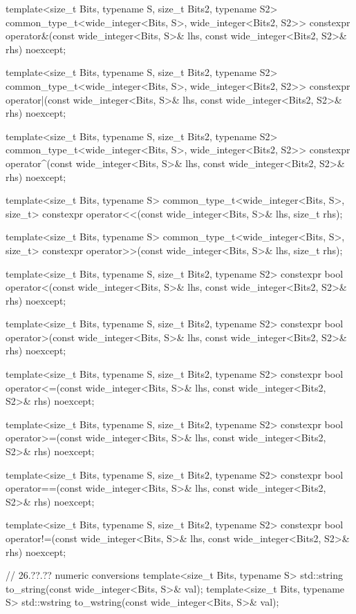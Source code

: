 \begin{codeblock}
{  template<size_t Bits, typename S, size_t Bits2, typename S2>
  common_type_t<wide_integer<Bits, S>, wide_integer<Bits2, S2>>
    constexpr operator&(const wide_integer<Bits, S>& lhs, const wide_integer<Bits2, S2>& rhs) noexcept;
  
  template<size_t Bits, typename S, size_t Bits2, typename S2>
  common_type_t<wide_integer<Bits, S>, wide_integer<Bits2, S2>>
    constexpr operator|(const wide_integer<Bits, S>& lhs, const wide_integer<Bits2, S2>& rhs) noexcept;
  
  template<size_t Bits, typename S, size_t Bits2, typename S2>
  common_type_t<wide_integer<Bits, S>, wide_integer<Bits2, S2>>
    constexpr  operator^(const wide_integer<Bits, S>& lhs, const wide_integer<Bits2, S2>& rhs) noexcept;
  
  template<size_t Bits, typename S>
  common_type_t<wide_integer<Bits, S>, size_t>
    constexpr  operator<<(const wide_integer<Bits, S>& lhs, size_t rhs);
  
  template<size_t Bits, typename S>
  common_type_t<wide_integer<Bits, S>, size_t>
    constexpr  operator>>(const wide_integer<Bits, S>& lhs, size_t rhs);
  
  template<size_t Bits, typename S, size_t Bits2, typename S2>
    constexpr bool operator<(const wide_integer<Bits, S>& lhs, const wide_integer<Bits2, S2>& rhs) noexcept;
  
  template<size_t Bits, typename S, size_t Bits2, typename S2>
    constexpr bool operator>(const wide_integer<Bits, S>& lhs, const wide_integer<Bits2, S2>& rhs) noexcept;
  
  template<size_t Bits, typename S, size_t Bits2, typename S2>
    constexpr bool operator<=(const wide_integer<Bits, S>& lhs, const wide_integer<Bits2, S2>& rhs) noexcept;
  
  template<size_t Bits, typename S, size_t Bits2, typename S2>
    constexpr bool operator>=(const wide_integer<Bits, S>& lhs, const wide_integer<Bits2, S2>& rhs) noexcept;
  
  template<size_t Bits, typename S, size_t Bits2, typename S2>
    constexpr bool operator==(const wide_integer<Bits, S>& lhs, const wide_integer<Bits2, S2>& rhs) noexcept;
  
  template<size_t Bits, typename S, size_t Bits2, typename S2>
    constexpr bool operator!=(const wide_integer<Bits, S>& lhs, const wide_integer<Bits2, S2>& rhs) noexcept;
  
  // 26.??.?? numeric conversions
  template<size_t Bits, typename S> std::string to_string(const wide_integer<Bits, S>& val);
  template<size_t Bits, typename S> std::wstring to_wstring(const wide_integer<Bits, S>& val);
  
}
\end{codeblock}
